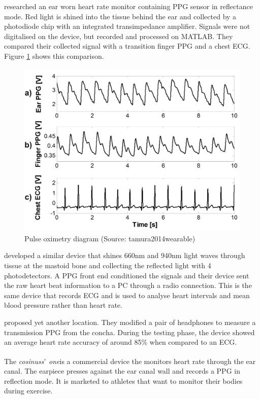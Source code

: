\cite{da2010ear} researched an ear worn heart rate monitor containing PPG sensor in reflectance mode. Red light is shined into the tissue behind the ear and collected by a photodiode chip with an integrated transimpedance amplifier. Signals were not digitalised on the device, but recorded and processed on MATLAB. They compared their collected signal with a transition finger PPG and a chest ECG. Figure \ref{fig:DaHe} shows this comparison.

\medskip

\begin{figure}[h]
   \centering
   \includegraphics[scale=0.15]{figs/DaHe}
   \caption{Pulse oximetry diagram (Source: tamura2014wearable)}
   \label{fig:DaHe}
\end{figure}

\cite{winokur2012wearable} developed a similar device that shines 660nm and 940nm light waves through tissue at the mastoid bone and collecting the reflected light with 4 photodetectors. A PPG front end conditioned the signals and their device sent the raw heart beat information to a PC through a radio connection. This is the same device that records ECG and is used to analyse heart intervals and mean blood pressure rather than heart rate.

\medskip
\cite{buskeheartbeat} proposed yet another location. They modified a pair of headphones to measure a transmission PPG from the concha. During the testing phase, the device showed an average heart rate accuracy of around 85\% when compared to an ECG.

\medskip
The \textit{cosinuss}$^{\circ}$ \textit{one}\textsuperscript \textregistered is a commercial device the monitors heart rate through the ear canal. The earpiece presses against the ear canal wall and records a PPG in reflection mode. It is marketed to athletes that want to monitor their bodies during exercise.

